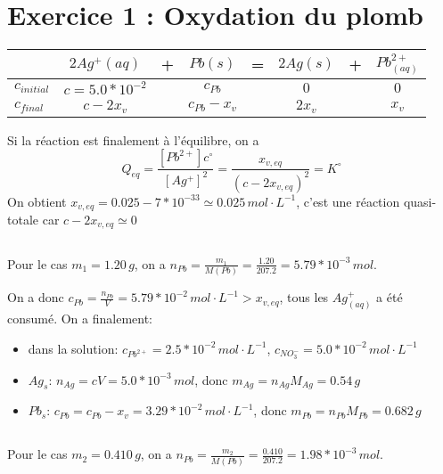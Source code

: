 \documentclass[a4paper,12pt]{book}
\begin{document}
\renewcommand{\labelitemi}{$\blacktriangleright$}
\renewcommand{\labelitemii}{$\bullet$}


\section{Exercice 1 : Oxydation du plomb}
\begin{table}[h]
\begin{center}
    \begin{tabular}{l|ccccccc}
    \hline
                      & $2Ag^+{(aq)}$      & + & $Pb{(s)}$       & = & $2Ag{(s)}$ & + & $Pb^{2+}_{(aq)}$ \\ \hline
        $c_{initial}$ & $c=5.0*10^{-2}$       &   & $c_{Pb}$      &   & $0$ &  & $0$\\ 
        $c_{final}$      & $c-2x_v$  &   & $c_{Pb}-x_v$  &   & $2x_v$ & & $x_v$\\ 
    \end{tabular}
\end{center}
\end{table}
Si la réaction est finalement à l'équilibre, on a 
$$
Q_{eq}=\frac{[Pb^{2+}]c^\circ}{[Ag^+]^2}=\frac{x_{v,eq}}{(c-2x_{v,eq})^2}=K^\circ
$$
On obtient $x_{v,eq}=0.025-7*10^{-33}\simeq 0.025\,mol \cdot L^{-1}$, c'est une réaction quasi-totale car $c-2x_{v,eq} \simeq 0$
\subsection{}
Pour le cas $m_1=1.20\,g$, on a $n_{Pb}=\frac{m_1}{M(Pb)}=\frac{1.20}{207.2}=5.79*10^{-3}\,mol$. 

\hspace*{\fill} 

On a donc $c_{Pb}=\frac{n_{Pb}}{V}=5.79*10^{-2}\, mol\cdot L^{-1}>x_{v,eq}$, tous les $Ag^+_{(aq)}$ a été consumé. On a finalement:
\begin{itemize}
    \item dans la solution: $\boxed{c_{Pb^{2+}}=2.5*10^{-2}\,mol\cdot L^{-1}}$, $\boxed{c_{NO_3^-}=5.0*10^{-2}\,mol\cdot L^{-1}}$
    \item $Ag_s$: $n_{Ag}=cV=5.0*10^{-3}\,mol$, donc $\boxed{m_{Ag}=n_{Ag}M_{Ag}=0.54\,g}$
    \item $Pb_s$: $c_{Pb}=c_{Pb}-x_v=3.29*10^{-2}\, mol\cdot L^{-1}$, donc $\boxed{m_{Pb}=n_{Pb}M_{Pb}=0.682\,g}$
\end{itemize}
\subsection{}
Pour le cas $m_2=0.410\,g$, on a $n_{Pb}=\frac{m_2}{M(Pb)}=\frac{0.410}{207.2}=1.98*10^{-3}\,mol$. 
\end{document}
